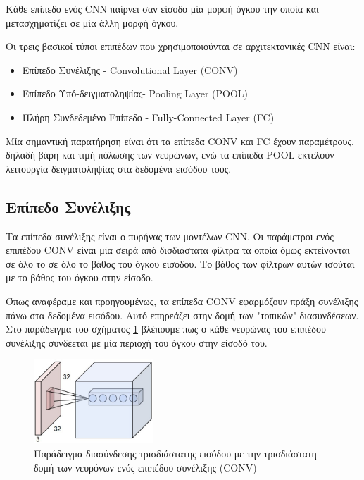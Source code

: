 Κάθε επίπεδο ενός CNN παίρνει σαν είσοδο μία μορφή όγκου την οποία
και μετασχηματίζει σε μία άλλη μορφή όγκου.

Οι τρεις βασικοί τύποι επιπέδων που χρησιμοποιούνται σε αρχιτεκτονικές CNN είναι:
\begin{itemize}
  \item{Επίπεδο Συνέλιξης - Convolutional Layer (CONV)}
  \item{Επίπεδο Υπό-δειγματοληψίας- Pooling Layer (POOL)}
  \item{Πλήρη Συνδεδεμένο Επίπεδο - Fully-Connected Layer (FC)}
\end{itemize}
Μία σημαντική παρατήρηση είναι ότι τα επίπεδα CONV και FC έχουν παραμέτρους, δηλαδή
βάρη και τιμή πόλωσης των νευρώνων, ενώ τα επίπεδα POOL εκτελούν λειτουργία
δειγματοληψίας στα δεδομένα εισόδου τους.


\subsection{Επίπεδο Συνέλιξης}

Τα επίπεδα συνέλιξης είναι ο πυρήνας των μοντέλων CNN. Οι παράμετροι ενός
επιπέδου CONV είναι μία σειρά από δισδιάστατα φίλτρα τα οποία όμως εκτείνονται
σε όλο το σε όλο το βάθος του όγκου εισόδου. Το βάθος των φίλτρων αυτών
ισούται με το βάθος του όγκου στην είσοδο.


Όπως αναφέραμε και προηγουμένως, τα επίπεδα CONV εφαρμόζουν πράξη συνέλιξης πάνω στα
δεδομένα εισόδου. Αυτό επηρεάζει στην δομή των "τοπικών" διασυνδέσεων.
Στο παράδειγμα του σχήματος \ref{fig:cnn_2} βλέπουμε πως ο κάθε νευρώνας
του επιπέδου συνέλιξης συνδέεται με μία περιοχή του όγκου στην είσοδό του.

\begin{figure}[!ht]
  \centering
  \includegraphics[width=0.4\textwidth]{./images/chapter3/cnn_2.jpg}
  \caption[%
    Παράδειγμα διασύνδεσης τρισδιάστατης εισόδου με την τρισδιάστατη δομή των
    νευρόνων ενός επιπέδου συνέλιξης (CONV)]{%
    Παράδειγμα διασύνδεσης τρισδιάστατης εισόδου με την τρισδιάστατη δομή των
    νευρόνων ενός επιπέδου συνέλιξης (CONV)}
  \label{fig:cnn_2}
\end{figure}

